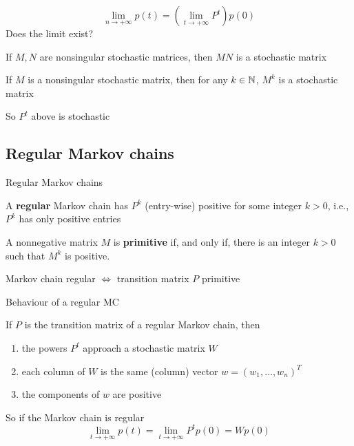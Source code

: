 \documentclass[aspectratio=169]{beamer}
\begin{document}
\begin{frame}
\[
\lim_{n\rightarrow +\infty}p(t) = 
\left(\lim_{t\rightarrow +\infty}P^t\right)p(0)
\]
Does the limit exist?
\vfill
\begin{theorem}
If $M,N$ are nonsingular stochastic matrices, then $MN$ is a stochastic matrix
\end{theorem}
\vfill
\begin{corollary}
If $M$ is a nonsingular stochastic matrix, then for any $k\in\mathbb{N}$, $M^k$ is a stochastic matrix
\end{corollary}
\vfill
So $P^t$ above is stochastic
\end{frame}

\subsection{Regular Markov chains}
\begin{frame}{Regular Markov chains}
\begin{definition}
A \textbf{regular} Markov chain has $P^k$ (entry-wise) positive for some integer $k>0$, i.e., $P^k$ has only positive entries
\end{definition}
\vfill
\begin{definition}
A nonnegative matrix $M$ is \textbf{primitive} if, and only if, there is an integer $k>0$ such that $M^k$ is positive.
\end{definition}
\vfill
\begin{theorem}
Markov chain regular $\iff$ transition matrix $P$ primitive
\end{theorem}
\end{frame}

\begin{frame}{Behaviour of a regular MC}
\begin{theorem}
If $P$ is the transition matrix of a regular Markov chain, then
\begin{enumerate}
\item the powers $P^t$ approach a stochastic matrix $W$
\item each column of $W$ is the same (column) vector $w=(w_1,\ldots,w_n)^T$
\item the components of $w$ are positive
\end{enumerate}
\end{theorem}
\vfill
So if the Markov chain is regular
\[
\lim_{t\rightarrow +\infty}p(t)=\lim_{t\rightarrow +\infty}P^tp(0)
=Wp(0)
\]
\end{frame}
\end{document}
